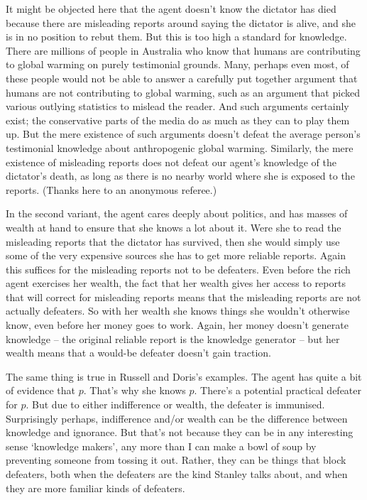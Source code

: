 \documentclass[oneside]{book}
\begin{document}
It might be objected here that the agent doesn't know the dictator has died because there are misleading reports around saying the dictator is alive, and she is in no position to rebut them. But this is too high a standard for knowledge. There are millions of people in Australia who know that humans are contributing to global warming on purely testimonial grounds. Many, perhaps even most, of these people would not be able to answer a carefully put together argument that humans are not contributing to global warming, such as an argument that picked various outlying statistics to mislead the reader. And such arguments certainly exist; the conservative parts of the media do as much as they can to play them up. But the mere existence of such arguments doesn't defeat the average person's testimonial knowledge about anthropogenic global warming. Similarly, the mere existence of misleading reports does not defeat our agent's knowledge of the dictator's death, as long as there is no nearby world where she is exposed to the reports. (Thanks here to an anonymous referee.)

In the second variant, the agent cares deeply about politics, and has masses of wealth at hand to ensure that she knows a lot about it. Were she to read the misleading reports that the dictator has survived, then she would simply use some of the very expensive sources she has to get more reliable reports. Again this suffices for the misleading reports not to be defeaters. Even before the rich agent exercises her wealth, the fact that her wealth gives her access to reports that will correct for misleading reports means that the misleading reports are not actually defeaters. So with her wealth she knows things she wouldn't otherwise know, even before her money goes to work. Again, her money doesn't generate knowledge -- the original reliable report is the knowledge generator -- but her wealth means that a would-be defeater doesn't gain traction.

The same thing is true in Russell and Doris's examples. The agent has quite a bit of evidence that $p$. That's why she knows $p$. There's a potential practical defeater for $p$. But due to either indifference or wealth, the defeater is immunised. Surprisingly perhaps, indifference and/or wealth can be the difference between knowledge and ignorance. But that's not because they can be in any interesting sense `knowledge makers', any more than I can make a bowl of soup by preventing someone from tossing it out. Rather, they can be things that block defeaters, both when the defeaters are the kind Stanley talks about, and when they are more familiar kinds of defeaters.
\end{document}
